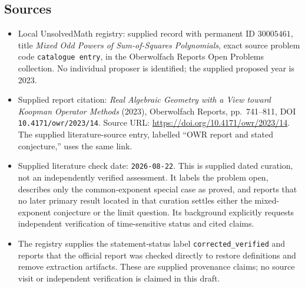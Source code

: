 \documentclass[11pt]{article}
\begin{document}
\subsection{Sources}
\begin{itemize}
\item Local UnsolvedMath registry: supplied record with permanent ID \(30005461\), title \emph{Mixed Odd Powers of Sum-of-Squares Polynomials}, exact source problem code \texttt{catalogue entry}, in the Oberwolfach Reports Open Problems collection. No individual proposer is identified; the supplied proposed year is 2023.
\item Supplied report citation: \emph{Real Algebraic Geometry with a View toward Koopman Operator Methods} (2023), Oberwolfach Reports, pp.~741--811, DOI \texttt{10.4171/owr/2023/14}. Source URL: \url{https://doi.org/10.4171/owr/2023/14}. The supplied literature-source entry, labelled ``OWR report and stated conjecture,'' uses the same link.
\item Supplied literature check date: \texttt{2026-08-22}. This is supplied dated curation, not an independently verified assessment. It labels the problem open, describes only the common-exponent special case as proved, and reports that no later primary result located in that curation settles either the mixed-exponent conjecture or the limit question. Its background explicitly requests independent verification of time-sensitive status and cited claims.
\item The registry supplies the statement-status label \texttt{corrected\_verified} and reports that the official report was checked directly to restore definitions and remove extraction artifacts. These are supplied provenance claims; no source visit or independent verification is claimed in this draft.
\end{itemize}
\end{document}
